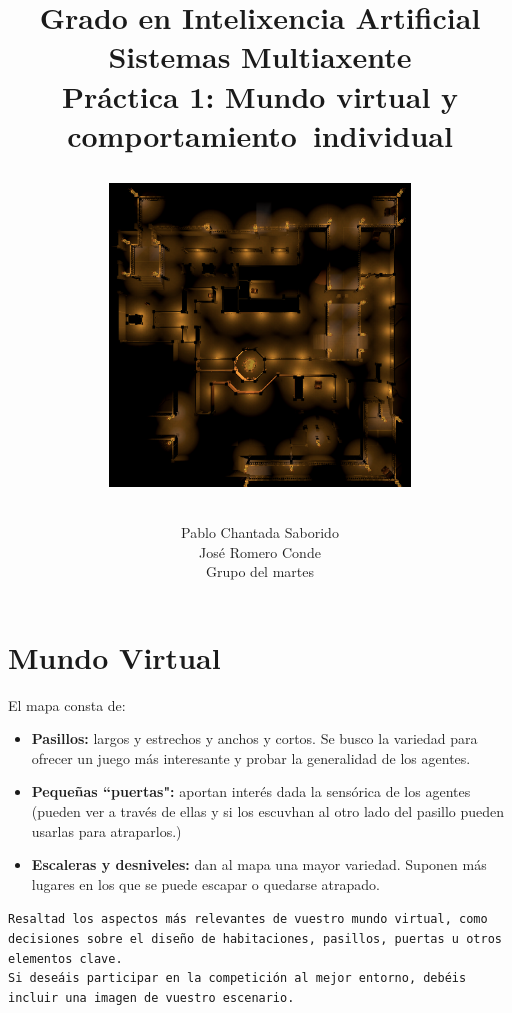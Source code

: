 \documentclass{article}
\begin{document}
\title{\vspace{-70pt}\begingroup  
    \centering
    \large Grado en Intelixencia Artificial\\
    \large Sistemas Multiaxente\\[0.5em]
    \large \textbf{Práctica 1: Mundo virtual y comportamiento~individual}\par 
    \vspace{20}
    \includegraphics[width=0.6\textwidth]{mapa.png}\\
\endgroup}
\author{Pablo Chantada Saborido \\ José Romero Conde \\ Grupo del martes}

\date{}
\maketitle
\vspace{-30pt}

\newpage
\section*{\large Mundo Virtual}

El mapa consta de:
\begin{itemize}
	\item  \textbf{Pasillos:} largos y estrechos y anchos y cortos. Se busco la variedad para ofrecer un juego más interesante y probar la generalidad de los agentes.
	\item  \textbf{Pequeñas ``puertas":} aportan interés dada la sensórica de los agentes (pueden ver a través de ellas y si los escuvhan al otro lado del pasillo pueden usarlas para atraparlos.) 
\item \textbf{Escaleras y desniveles:} dan al mapa una mayor variedad. Suponen más lugares en los que se puede escapar o quedarse atrapado. 
\end{itemize}
\texttt{Resaltad los aspectos más relevantes de vuestro mundo virtual, como decisiones sobre el diseño de habitaciones, pasillos, puertas u otros elementos clave. \\ Si deseáis participar en la competición al mejor entorno, debéis incluir una imagen de vuestro escenario.}
\end{document}
